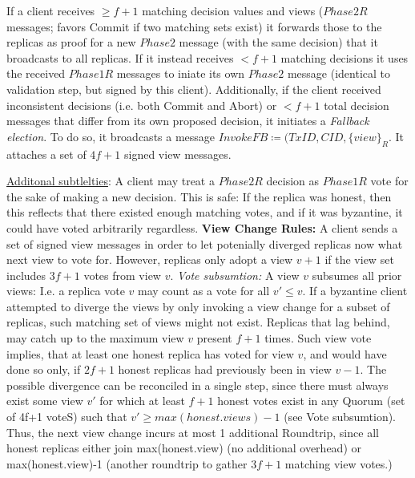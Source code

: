 
If a client receives $\geq f+1$ matching decision values and views ($Phase2R$ messages; favors Commit if two matching sets exist) it forwards those to the replicas as proof for a new $Phase2$ message (with the same decision) that it broadcasts to all replicas. If it instead receives $< f+1$ matching decisions it uses the received $Phase1R$ messages to iniate its own $Phase2$ message (identical to validation step, but signed by this client). 
Additionally, if the client received inconsistent decisions (i.e. both Commit and Abort)  or $<f+1$ total decision messages that differ from its own proposed decision, it initiates a \textit{Fallback election}. To do so, it broadcasts a message $InvokeFB \coloneqq (TxID, CID, \{view\}_R$. It attaches a set of $4f+1$ signed view messages.  

\underline{Additonal subtlelties}: A client may treat a $Phase2R$ decision as $Phase1R$ vote for the sake of making a new decision. This is safe: If the replica was honest, then this reflects that there existed enough matching votes, and if it was byzantine, it could have voted arbitrarily regardless. 
 \textbf{View Change Rules:} A client sends a set of signed view messages in order to let potenially diverged replicas now what next view to vote for. However, replicas only adopt a view $v+1$ if the view set includes $3f+1$  votes from view $v$. \textit{Vote subsumtion:} A view $v$ subsumes all prior views: I.e. a replica vote $v$ may count as a vote for all $v' \leq v$. If a byzantine client attempted to diverge the views by only invoking a view change for a subset of replicas, such matching set of views might not exist. 
Replicas that lag behind, may catch up to the maximum view $v$ present $f+1$ times. Such view vote implies, that at least one honest replica has voted for view $v$, and would have done so only, if $2f+1$ honest replicas had previously been in view $v-1$. The possible divergence can be reconciled in a single step, since there must always exist some view $v'$ for which at least $f+1$ honest votes exist in any Quorum (set of 4f+1 voteS) such that $v' \geq max(honest.views) -1 $ (see Vote subsumtion). Thus, the next view change incurs at most 1 additional Roundtrip, since all honest replicas either join max(honest.view) (no additional overhead) or max(honest.view)-1 (another roundtrip to gather $3f+1$ matching view votes.)



